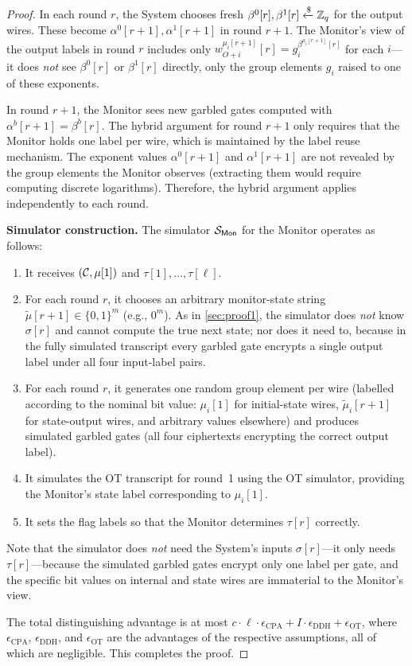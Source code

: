 \begin{proof}
In each round $r$, the System chooses fresh $\beta^0[r], \beta^1[r] \xleftarrow{\$} \mathbb{Z}_q$ for the output wires. These become $\alpha^0[r+1], \alpha^1[r+1]$ in round $r+1$. The Monitor's view of the output labels in round $r$ includes only $w_{O+i}^{\mu_i[r+1]}[r] = g_i^{\beta^{\mu_i[r+1]}[r]}$ for each $i$---it does \emph{not} see $\beta^0[r]$ or $\beta^1[r]$ directly, only the group elements $g_i$ raised to one of these exponents.

In round $r+1$, the Monitor sees new garbled gates computed with $\alpha^b[r+1] = \beta^b[r]$. The hybrid argument for round $r+1$ only requires that the Monitor holds one label per wire, which is maintained by the label reuse mechanism. The exponent values $\alpha^0[r+1]$ and $\alpha^1[r+1]$ are not revealed by the group elements the Monitor observes (extracting them would require computing discrete logarithms). Therefore, the hybrid argument applies independently to each round.

\medskip
\noindent\textbf{Simulator construction.}
The simulator $\mathcal{S}_{\textsf{Mon}}$ for the Monitor operates as follows:
\begin{enumerate}
    \item It receives $(\mathcal{C}, \mu[1])$ and $\tau[1], \ldots, \tau[\ell]$.
    \item For each round $r$, it chooses an arbitrary monitor-state string $\tilde{\mu}[r+1] \in \{0,1\}^m$ (e.g., $0^m$). As in \cref{sec:proof1}, the simulator does \emph{not} know $\sigma[r]$ and cannot compute the true next state; nor does it need to, because in the fully simulated transcript every garbled gate encrypts a single output label under all four input-label pairs.
    \item For each round $r$, it generates one random group element per wire (labelled according to the nominal bit value: $\mu_i[1]$ for initial-state wires, $\tilde{\mu}_i[r+1]$ for state-output wires, and arbitrary values elsewhere) and produces simulated garbled gates (all four ciphertexts encrypting the correct output label).
    \item It simulates the OT transcript for round~1 using the OT simulator, providing the Monitor's state label corresponding to $\mu_i[1]$.
    \item It sets the flag labels so that the Monitor determines $\tau[r]$ correctly.
\end{enumerate}

Note that the simulator does \emph{not} need the System's inputs $\sigma[r]$---it only needs $\tau[r]$---because the simulated garbled gates encrypt only one label per gate, and the specific bit values on internal and state wires are immaterial to the Monitor's view.

The total distinguishing advantage is at most $c \cdot \ell \cdot \epsilon_{\text{CPA}} + I \cdot \epsilon_{\text{DDH}} + \epsilon_{\text{OT}}$, where $\epsilon_{\text{CPA}}$, $\epsilon_{\text{DDH}}$, and $\epsilon_{\text{OT}}$ are the advantages of the respective assumptions, all of which are negligible. This completes the proof.
\end{proof}
